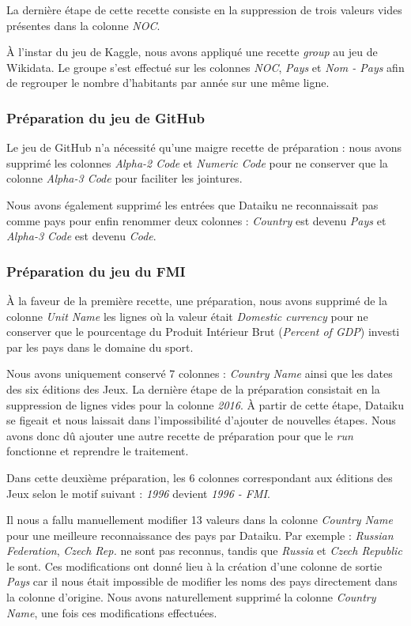 \documentclass[hidelinks, 12pt]{article}
\begin{document}
La dernière étape de cette recette consiste en la suppression de trois valeurs vides présentes dans la colonne \emph{NOC}.

À l'instar du jeu de Kaggle, nous avons appliqué une recette \emph{group} au jeu de Wikidata. Le groupe s'est effectué sur les colonnes \emph{NOC}, \emph{Pays} et \emph{Nom - Pays} afin de regrouper le nombre d'habitants par année sur une même ligne.

\subsubsection{Préparation du jeu de GitHub}

Le jeu de GitHub n'a nécessité qu'une maigre recette de préparation : nous avons supprimé les colonnes \emph{Alpha-2 Code} et \emph{Numeric Code} pour ne conserver que la colonne \emph{Alpha-3 Code} pour faciliter les jointures.

Nous avons également supprimé les entrées que Dataiku ne reconnaissait pas comme pays pour enfin renommer deux colonnes : \emph{Country} est devenu \emph{Pays} et \emph{Alpha-3 Code} est devenu \emph{Code}.

\subsubsection{Préparation du jeu du FMI}

À la faveur de la première recette, une préparation, nous avons supprimé de la colonne \emph{Unit Name} les lignes où la valeur était \emph{Domestic currency} pour ne conserver que le pourcentage du Produit Intérieur Brut (\emph{Percent of GDP}) investi par les pays dans le domaine du sport.

Nous avons uniquement conservé 7 colonnes : \emph{Country Name} ainsi que les dates des six éditions des Jeux. La dernière étape de la préparation consistait en la suppression de lignes vides pour la colonne \emph{2016}. À partir de cette étape, Dataiku se figeait et nous laissait dans l'impossibilité d'ajouter de nouvelles étapes. Nous avons donc dû ajouter une autre recette de préparation pour que le \emph{run} fonctionne et reprendre le traitement.

Dans cette deuxième préparation, les 6 colonnes correspondant aux éditions des Jeux selon le motif suivant : \emph{1996} devient \emph{1996 - FMI}. 

Il nous a fallu manuellement modifier 13 valeurs dans la colonne \emph{Country Name} pour une meilleure reconnaissance des pays par Dataiku. Par exemple : \emph{Russian Federation}, \emph{Czech Rep.} ne sont pas reconnus, tandis que \emph{Russia} et \emph{Czech Republic} le sont. Ces modifications ont donné lieu à la création d'une colonne de sortie \emph{Pays} car il nous était impossible de modifier les noms des pays directement dans la colonne d'origine. Nous avons naturellement supprimé la colonne \emph{Country Name}, une fois ces modifications effectuées. 
\end{document}
